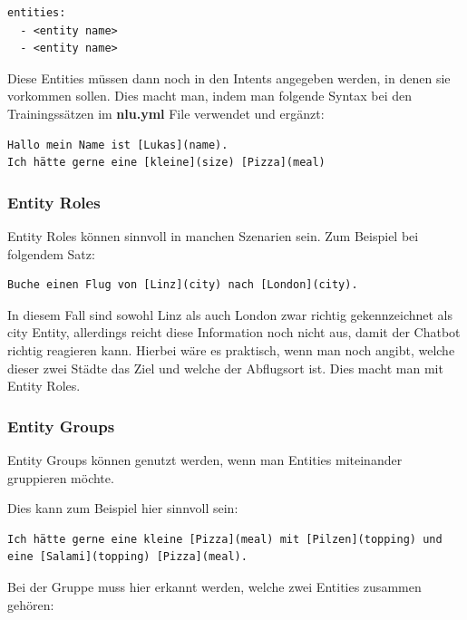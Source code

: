 \begin{lstlisting}[label={lst: Entities Domain Example}]
entities:
  - <entity name>
  - <entity name>
\end{lstlisting}

Diese Entities müssen dann noch in den Intents angegeben werden, in denen sie vorkommen sollen.
Dies macht man, indem man folgende Syntax bei den Trainingssätzen im \textbf{nlu.yml} File verwendet und ergänzt:

\begin{lstlisting}[label={lst: Entities NLU Example}]
Hallo mein Name ist [Lukas](name).
Ich hätte gerne eine [kleine](size) [Pizza](meal)
\end{lstlisting}

\subsubsection{Entity Roles}

Entity Roles können sinnvoll in manchen Szenarien sein.
Zum Beispiel bei folgendem Satz:

\begin{lstlisting}[label={lst: Entity Roles Example}]
Buche einen Flug von [Linz](city) nach [London](city).
\end{lstlisting}

In diesem Fall sind sowohl Linz als auch London zwar richtig gekennzeichnet als city Entity, allerdings reicht diese Information noch nicht aus, damit der Chatbot richtig reagieren kann.
Hierbei wäre es praktisch, wenn man noch angibt, welche dieser zwei Städte das Ziel und welche der Abflugsort ist.
Dies macht man mit Entity Roles.\cite{entityRolesGroups}

\subsubsection{Entity Groups}

Entity Groups können genutzt werden, wenn man Entities miteinander gruppieren möchte.\cite{entityRolesGroups}

Dies kann zum Beispiel hier sinnvoll sein:

\begin{lstlisting}[label={lst: Entity Groups Example 1}]
Ich hätte gerne eine kleine [Pizza](meal) mit [Pilzen](topping) und eine [Salami](topping) [Pizza](meal).
\end{lstlisting}

Bei der Gruppe muss hier erkannt werden, welche zwei Entities zusammen gehören\cite{entityRolesGroups}:

